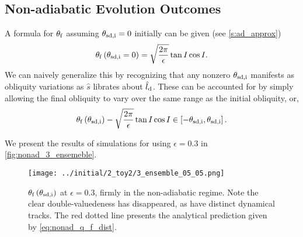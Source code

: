 \documentclass[
        fleqn,
        usenatbib,
        referee,
    ]{mnras}
\newcommand*{\p}[1]{\left(#1\right)}
\newcommand*{\s}[1]{\left[#1\right]}
\begin{document}
\subsection{Non-adiabatic Evolution Outcomes}

A formula for $\theta_{\rm f}$ assuming $\theta_{\rm sd, i} = 0$ initially can
be given (see \autoref{s:ad_approx})
\begin{equation}
    \theta_{\rm f}\p{\theta_{\rm sd, i} = 0} = \sqrt{\frac{2\pi}{\epsilon}} \tan
        I\cos I.\label{eq:nonad_q_f}
\end{equation}
We can naively generalize this by recognizing that any nonzero $\theta_{\rm sd,
i}$ manifests as obliquity variations as $\hat{s}$ librates about $\hat{l}_{\rm
d}$. These can be accounted for by simply allowing the final obliquity to vary
over the same range as the initial obliquity, or,
\begin{equation}
    \theta_{\rm f}\p{\theta_{\rm sd, i}} - \sqrt{\frac{2\pi}{\epsilon}} \tan
        I\cos I\in \s{-\theta_{\rm sd, i}, \theta_{\rm sd,i}}
        .\label{eq:nonad_q_f_dist}
\end{equation}

We present the results of simulations for using $\epsilon = 0.3$ in
\autoref{fig:nonad_3_ensemeble}.
\begin{figure}
    \centering
    \texttt{[image: ../initial/2\_toy2/3\_ensemble\_05\_05.png]}
    \caption{$\theta_{\rm  f}\p{\theta_{\rm sd, i}}$ at $\epsilon = 0.3$, firmly
    in the non-adiabatic regime. Note the clear double-valuedeness has
    disappeared, as have distinct dynamical tracks. The red dotted line presents
    the analytical prediction given by
    \autoref{eq:nonad_q_f_dist}.}\label{fig:nonad_3_ensemeble}
\end{figure}
\end{document}
